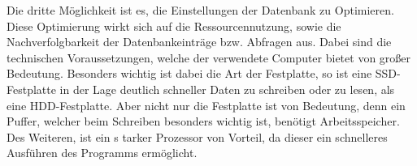 Die dritte Möglichkeit ist es, die Einstellungen der Datenbank zu Optimieren.
Diese Optimierung wirkt sich auf die Ressourcennutzung, sowie die
Nachverfolgbarkeit der Datenbankeinträge bzw. Abfragen aus. Dabei sind die
technischen Voraussetzungen, welche der verwendete Computer bietet von großer
Bedeutung. Besonders wichtig ist dabei die Art der Festplatte, so ist eine
SSD-Festplatte in der Lage deutlich schneller Daten zu schreiben oder zu lesen,
als eine HDD-Festplatte. Aber nicht nur die Festplatte ist von Bedeutung, denn
ein Puffer, welcher beim Schreiben besonders wichtig ist, benötigt
Arbeitsspeicher. Des Weiteren, ist ein s tarker Prozessor von Vorteil, da dieser
ein schnelleres Ausführen des Programms ermöglicht.

\clearpage